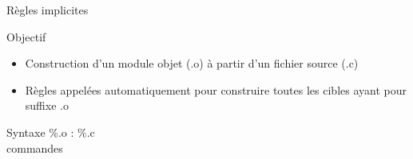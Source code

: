 \documentclass[10pt,xcolor=dvipsnames]{beamer}
\begin{document}
\begin{frame}{Règles implicites}
    \begin{exampleblock}{Objectif}
    \begin{itemize}
        \item Construction d'un module objet (.o) à partir d'un fichier source (.c)
        \item Règles appelées automatiquement pour construire toutes les cibles ayant pour suffixe .o
    \end{itemize}
    \end{exampleblock}
    
    \begin{exampleblock}{Syntaxe}
    \%.o : \%.c\\
    		commandes 
    \end{exampleblock}
\end{frame}
\end{document}
